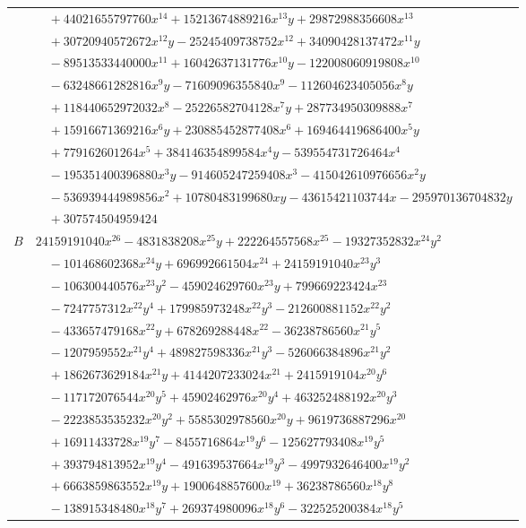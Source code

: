\documentclass[11pt]{article}
\begin{document}
\begin{longtable}{@{}ll@{}}
 & $\quad +44021655797760x^{14}+15213674889216x^{13}y+29872988356608x^{13}$\\
 & $\quad +30720940572672x^{12}y-25245409738752x^{12}+34090428137472x^{11}y$\\
 & $\quad -89513533440000x^{11}+16042637131776x^{10}y-122008060919808x^{10}$\\
 & $\quad -63248661282816x^{9}y-71609096355840x^{9}-112604623405056x^{8}y$\\
 & $\quad +118440652972032x^{8}-25226582704128x^{7}y+287734950309888x^{7}$\\
 & $\quad +15916671369216x^{6}y+230885452877408x^{6}+169464419686400x^{5}y$\\
 & $\quad +779162601264x^{5}+384146354899584x^{4}y-539554731726464x^{4}$\\
 & $\quad -195351400396880x^{3}y-914605247259408x^{3}-415042610976656x^{2}y$\\
 & $\quad -536939444989856x^{2}+10780483199680xy-43615421103744x-295970136704832y$\\
 & $\quad +307574504959424$\\
$B$ & $24159191040x^{26}-4831838208x^{25}y+222264557568x^{25}-19327352832x^{24}y^{2}$\\
 & $\quad -101468602368x^{24}y+696992661504x^{24}+24159191040x^{23}y^{3}$\\
 & $\quad -106300440576x^{23}y^{2}-459024629760x^{23}y+799669223424x^{23}$\\
 & $\quad -7247757312x^{22}y^{4}+179985973248x^{22}y^{3}-212600881152x^{22}y^{2}$\\
 & $\quad -433657479168x^{22}y+678269288448x^{22}-36238786560x^{21}y^{5}$\\
 & $\quad -1207959552x^{21}y^{4}+489827598336x^{21}y^{3}-526066384896x^{21}y^{2}$\\
 & $\quad +1862673629184x^{21}y+4144207233024x^{21}+2415919104x^{20}y^{6}$\\
 & $\quad -117172076544x^{20}y^{5}+45902462976x^{20}y^{4}+463252488192x^{20}y^{3}$\\
 & $\quad -2223853535232x^{20}y^{2}+5585302978560x^{20}y+9619736887296x^{20}$\\
 & $\quad +16911433728x^{19}y^{7}-8455716864x^{19}y^{6}-125627793408x^{19}y^{5}$\\
 & $\quad +393794813952x^{19}y^{4}-491639537664x^{19}y^{3}-4997932646400x^{19}y^{2}$\\
 & $\quad +6663859863552x^{19}y+1900648857600x^{19}+36238786560x^{18}y^{8}$\\
 & $\quad -138915348480x^{18}y^{7}+269374980096x^{18}y^{6}-322525200384x^{18}y^{5}$\\

\end{longtable}
\end{document}
